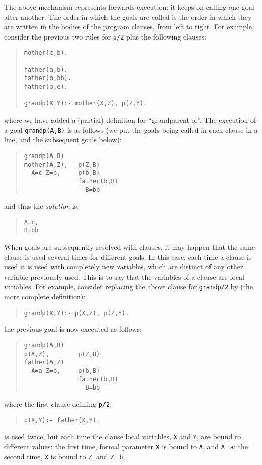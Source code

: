 The above mechanism represents forwards execution: it keeps on calling
one goal after another. The order in which the goals are called is the
order in which they are written in the bodies of the program clauses,
from left to right. For example, consider the previous two rules for
\verb+p/2+ plus the following clauses:
\begin{quote}
\begin{verbatim}
mother(c,b).

father(a,b).
father(b,bb).
father(b,e).

grandp(X,Y):- mother(X,Z), p(Z,Y).
\end{verbatim}
\end{quote}
%
where we have added a (partial) definition for ``grandparent of''. The
execution of a goal \verb+grandp(A,B)+ is as follows (we put the goals
being called in each clause in a line, and the subsequent goals
below):
\begin{quote}
\begin{verbatim}
grandp(A,B)
mother(A,Z),   p(Z,B)
  A=c Z=b,     p(b,B)
               father(b,B)
                 B=bb
\end{verbatim}
\end{quote}
%
and thus the {\em solution} is:
\begin{quote}
\begin{verbatim}
A=c,
B=bb
\end{verbatim}
\end{quote}

When goals are subsequently resolved with clauses, it may happen that
the same clause is used several times for different goals. In this
case, each time a clause is used it is used with completely new
variables, which are distinct of any other variable previously
used. This is to say that the variables of a clause are local
variables. For example, consider replacing the above clause for
\verb+grandp/2+ by (the more complete definition):
\begin{quote}
\begin{verbatim}
grandp(X,Y):- p(X,Z), p(Z,Y).
\end{verbatim}
\end{quote}
%
the previous goal is now executed as follows:
\begin{quote}
\begin{verbatim}
grandp(A,B)
p(A,Z),        p(Z,B)
father(A,Z)
  A=a Z=b,     p(b,B)
               father(b,B)
                 B=bb
\end{verbatim}
\end{quote}
%
where the first clause defining \verb+p/2+,
\begin{quote}
\begin{verbatim}
p(X,Y):- father(X,Y).
\end{verbatim}
\end{quote}
%
is used twice, but each time the clause local variables, \verb+X+ and
\verb+Y+, are bound to different values: the first time, formal
parameter \verb+X+ is bound to \verb+A+, and \verb+A+=\verb+a+; the
second time, \verb+X+ is bound to \verb+Z+, and \verb+Z+=\verb+b+. 

